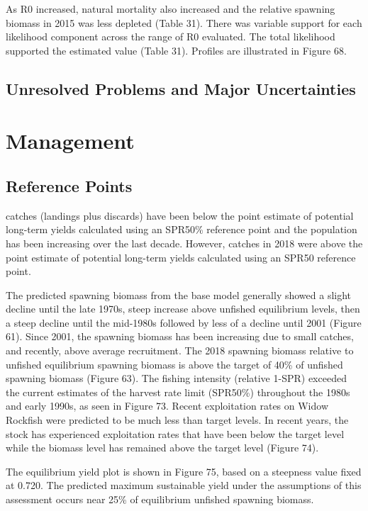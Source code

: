 \documentclass[
]{scrartcl}
\begin{document}
As R0 increased, natural mortality also increased and the relative
spawning biomass in 2015 was less depleted (Table 31). There was
variable support for each likelihood component across the range of R0
evaluated. The total likelihood supported the estimated value (Table
31). Profiles are illustrated in Figure 68.

\subsection{Unresolved Problems and Major
Uncertainties}\label{unresolved-problems-and-major-uncertainties}

\newpage{}

\section{Management}\label{management}

\subsection{Reference Points}\label{reference-points-1}

catches (landings plus discards) have been below the point estimate of
potential long-term yields calculated using an SPR50\% reference point
and the population has been increasing over the last decade. However,
catches in 2018 were above the point estimate of potential long-term
yields calculated using an SPR50 reference point.

The predicted spawning biomass from the base model generally showed a
slight decline until the late 1970s, steep increase above unfished
equilibrium levels, then a steep decline until the mid-1980s followed by
less of a decline until 2001 (Figure 61). Since 2001, the spawning
biomass has been increasing due to small catches, and recently, above
average recruitment. The 2018 spawning biomass relative to unfished
equilibrium spawning biomass is above the target of 40\% of unfished
spawning biomass (Figure 63). The fishing intensity (relative 1-SPR)
exceeded the current estimates of the harvest rate limit (SPR50\%)
throughout the 1980s and early 1990s, as seen in Figure 73. Recent
exploitation rates on Widow Rockfish were predicted to be much less than
target levels. In recent years, the stock has experienced exploitation
rates that have been below the target level while the biomass level has
remained above the target level (Figure 74).

The equilibrium yield plot is shown in Figure 75, based on a steepness
value fixed at 0.720. The predicted maximum sustainable yield under the
assumptions of this assessment occurs near 25\% of equilibrium unfished
spawning biomass.
\end{document}
